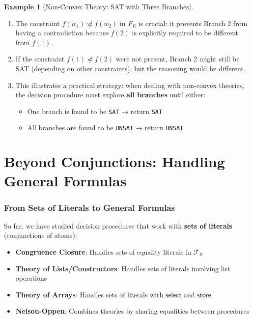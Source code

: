\documentclass[11pt,a4paper]{article}
\theoremstyle{definition}
\newtheorem{example}{Example}[section]
\theoremstyle{plain}
\theoremstyle{remark}
\begin{document}
\begin{example}[Non-Convex Theory: SAT with Three Branches]
\begin{tcolorbox}[colback=green!5!white,colframe=green!75!black,title=\textbf{Example 4: Non-Convex $\mathcal{T}_{\text{LIA}}$ — One SAT Branch Suffices},breakable]
\begin{enumerate}
    \item The constraint $f(w_1) \not\backsimeq f(w_2)$ in $F_E$ is crucial: it prevents Branch 2 from having a contradiction because $f(2)$ is explicitly required to be different from $f(1)$.

    \item If the constraint $f(1) \not\backsimeq f(2)$ were not present, Branch 2 might still be SAT (depending on other constraints), but the reasoning would be different.

    \item This illustrates a practical strategy: when dealing with non-convex theories, the decision procedure must explore \textbf{all branches} until either:
    \begin{itemize}
        \item One branch is found to be \texttt{SAT} → return \texttt{SAT}
        \item All branches are found to be \texttt{UNSAT} → return \texttt{UNSAT}
    \end{itemize}
\end{enumerate}
\end{tcolorbox}
\end{example}

\newpage



\part{Beyond Conjunctions: Handling General Formulas}



\section{From Sets of Literals to General Formulas}



So far, we have studied decision procedures that work with \textbf{sets of literals} (conjunctions of atoms):



\begin{itemize}

    \item \textbf{Congruence Closure}: Handles sets of equality literals in $\mathcal{T}_E$

    \item \textbf{Theory of Lists/Constructors}: Handles sets of literals involving list operations

    \item \textbf{Theory of Arrays}: Handles sets of literals with $\textsf{select}$ and $\textsf{store}$

    \item \textbf{Nelson-Oppen}: Combines theories by sharing equalities between procedures

\end{itemize}
\end{document}
